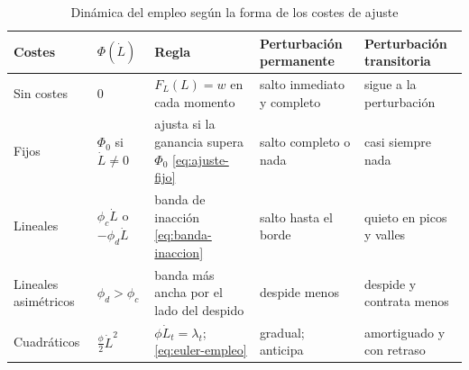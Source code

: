 \documentclass[11pt]{article}
\begin{document}
\begin{table}[H]
\centering
\caption{Dinámica del empleo según la forma de los costes de ajuste}\label{tab:costes-ajuste}
\small
\begin{tabular}{>{\raggedright\arraybackslash}m{2.1cm}>{\centering\arraybackslash}m{2.5cm}>{\raggedright\arraybackslash}m{3.7cm}>{\raggedright\arraybackslash}m{3.1cm}>{\raggedright\arraybackslash}m{3cm}}
\toprule
\rowcolor{tceeazulpalido}\textbf{Costes} & \textbf{$\Phi(\dot L)$} & \textbf{Regla} & \textbf{Perturbación permanente} & \textbf{Perturbación transitoria}\\
\midrule
Sin costes & $0$ & $F_L(L)=w$ en cada momento & \textcolor{tceeazul}{salto inmediato y completo} & \textcolor{tceeazul}{sigue a la perturbación}\\
\addlinespace[0.3em]
Fijos & $\Phi_0$ si $\dot L\neq0$ & ajusta si la ganancia supera $\Phi_0$ \eqref{eq:ajuste-fijo} & \textcolor{tceedorado}{salto completo o nada} & \textcolor{tceedorado}{casi siempre nada}\\
\addlinespace[0.3em]
Lineales & $\phi_c\dot L$ o $-\phi_d\dot L$ & banda de inacción \eqref{eq:banda-inaccion} & \textcolor{tceeverde}{salto hasta el borde} & \textcolor{tceeverde}{quieto en picos y valles}\\
\addlinespace[0.3em]
Lineales asimétricos & $\phi_d>\phi_c$ & banda más ancha por el lado del despido & \textcolor{tceeverde}{despide menos} & \textcolor{tceeverde}{despide y contrata menos}\\
\addlinespace[0.3em]
Cuadráticos & $\tfrac{\phi}{2}\dot L^{2}$ & $\phi\dot L_t=\lambda_t$; \eqref{eq:euler-empleo} & \textcolor{tceemorado}{gradual; anticipa} & \textcolor{tceemorado}{amortiguado y con retraso}\\
\bottomrule
\end{tabular}
\end{table}
\end{document}
